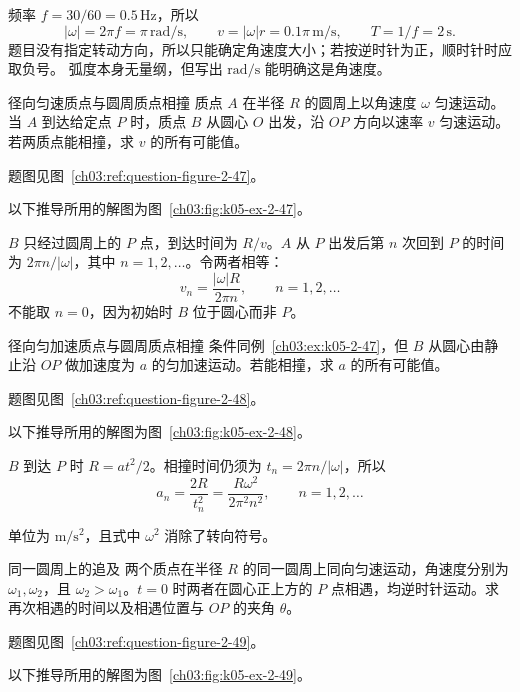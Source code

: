 {\begin{xesolution}
频率 $f=30/60=0.5\,\mathrm{Hz}$，所以
\[
 \boxed{|\omega|=2\pi f=\pi\,\mathrm{rad/s}},\qquad
 \boxed{v=|\omega|r=0.1\pi\,\mathrm{m/s}},\qquad
 \boxed{T=1/f=2\,\mathrm s}.
\]
题目没有指定转动方向，所以只能确定角速度大小；若按逆时针为正，顺时针时应取负号。
弧度本身无量纲，但写出 $\mathrm{rad/s}$ 能明确这是角速度。
\end{xesolution}

\begin{origexamplebox}{径向匀速质点与圆周质点相撞}\label{ch03:ex:k05-2-47}
质点 $A$ 在半径 $R$ 的圆周上以角速度 $\omega$ 匀速运动。当 $A$ 到达给定点 $P$ 时，质点 $B$ 从圆心 $O$ 出发，沿 $OP$ 方向以速率 $v$ 匀速运动。若两质点能相撞，求 $v$ 的所有可能值。
\par 题图见图~\ref{ch03:ref:question-figure-2-47}。
\KQuestionBV
\end{origexamplebox}
\begin{xesolution}
以下推导所用的解图为图~\ref{ch03:fig:k05-ex-2-47}。

$B$ 只经过圆周上的 $P$ 点，到达时间为 $R/v$。$A$ 从 $P$ 出发后第 $n$ 次回到 $P$ 的时间为 $2\pi n/|\omega|$，其中 $n=1,2,\ldots$。令两者相等：
\RadialUniformCollisionDiagram
\[
 \boxed{v_n=\frac{|\omega|R}{2\pi n}},\qquad n=1,2,\ldots
\]
不能取 $n=0$，因为初始时 $B$ 位于圆心而非 $P$。
\end{xesolution}

\begin{origexamplebox}{径向匀加速质点与圆周质点相撞}\label{ch03:ex:k05-2-48}
条件同例~\ref{ch03:ex:k05-2-47}，但 $B$ 从圆心由静止沿 $OP$ 做加速度为 $a$ 的匀加速运动。若能相撞，求 $a$ 的所有可能值。
\par 题图见图~\ref{ch03:ref:question-figure-2-48}。
\KQuestionBW
\end{origexamplebox}
\begin{xesolution}
以下推导所用的解图为图~\ref{ch03:fig:k05-ex-2-48}。

$B$ 到达 $P$ 时 $R=at^2/2$。相撞时间仍须为 $t_n=2\pi n/|\omega|$，所以
\[
 \boxed{a_n=\frac{2R}{t_n^2}=\frac{R\omega^2}{2\pi^2n^2}},
 \qquad n=1,2,\ldots
\]
\RadialAcceleratedCollisionDiagram

单位为 $\mathrm{m/s^2}$，且式中 $\omega^2$ 消除了转向符号。
\end{xesolution}

\begin{origexamplebox}{同一圆周上的追及}\label{ch03:ex:k05-2-49}
两个质点在半径 $R$ 的同一圆周上同向匀速运动，角速度分别为 $\omega_1,\omega_2$，且 $\omega_2>\omega_1$。$t=0$ 时两者在圆心正上方的 $P$ 点相遇，均逆时针运动。求再次相遇的时间以及相遇位置与 $OP$ 的夹角 $\theta$。
\par 题图见图~\ref{ch03:ref:question-figure-2-49}。
\KQuestionBX
\end{origexamplebox}
\begin{xesolution}
以下推导所用的解图为图~\ref{ch03:fig:k05-ex-2-49}。


\end{xesolution}}

